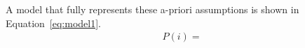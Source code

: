 A model that fully represents these a-priori assumptions is shown in Equation~\ref{eq:model1}.
\begin{align}
    P(i) = 
\end{align}
